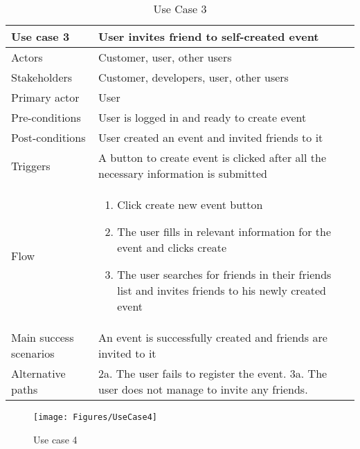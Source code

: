 \begin{table}[H]
\begin{tabular}{ | L{0.25\linewidth} | L{0.75\linewidth} | } 
 \hline {}
 Use case 3 & User invites friend to self-created event  \\ 
 \hline
 Actors & Customer, user, other users \\ 
 \hline
 Stakeholders & Customer, developers, user, other users \\ 
  \hline
 Primary actor & User  \\ 
 \hline
 Pre-conditions & User is logged in and ready to create event \\ 
 \hline
 Post-conditions & User created an event and invited friends to it \\ 
  \hline
 Triggers & A button to create event is clicked after all the necessary information is submitted  \\ 
 \hline
Flow & \begin{minipage}{5in}
    \vskip 1pt
    \begin{enumerate}
  \item Click create new event button
  \item The user fills in relevant information for the event and clicks create
  \item The user searches for friends in their friends list and invites friends to his newly created event
   \end{enumerate}
   \vskip 4pt
 \end{minipage}\\ 
 \hline
 Main success scenarios & An event is successfully created and friends are invited to it \\ 
 \hline
 Alternative paths & 2a. The user fails to register the event.
3a. The user does not manage to invite any friends.\\
 \hline
\end{tabular}
\caption{Use Case 3}
\end{table}

\begin{figure}[H]
\centering
\texttt{[image: Figures/UseCase4]}
\caption{Use case 4}
    \label{fig:UC4}
    \end{figure}

